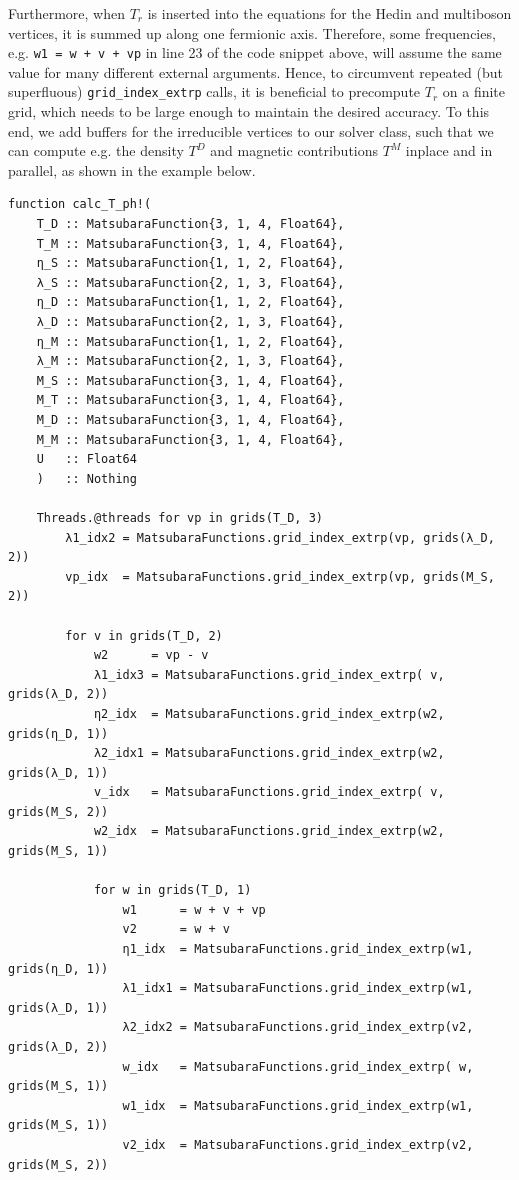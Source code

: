 \documentclass{SciPost}
\begin{document}
Furthermore, when $T_r$ is inserted into the equations for the Hedin and multiboson vertices, it is summed up along one fermionic axis. Therefore, some frequencies, e.g. \texttt{w1 = w + v + vp} in line 23 of the code snippet above, will assume the same value for many different external arguments. Hence, to circumvent repeated (but superfluous) \texttt{grid\_index\_extrp} calls, it is beneficial to precompute $T_r$ on a finite grid, which needs to be large enough to maintain the desired accuracy. To this end, we add buffers for the irreducible vertices to our solver class, such that we can compute e.g. the density $T^D$ and magnetic contributions $T^M$ inplace and in parallel, as shown in the example below.
%
\begin{verbatim}
function calc_T_ph!(
    T_D :: MatsubaraFunction{3, 1, 4, Float64},
    T_M :: MatsubaraFunction{3, 1, 4, Float64},
    η_S :: MatsubaraFunction{1, 1, 2, Float64},
    λ_S :: MatsubaraFunction{2, 1, 3, Float64},
    η_D :: MatsubaraFunction{1, 1, 2, Float64},
    λ_D :: MatsubaraFunction{2, 1, 3, Float64},
    η_M :: MatsubaraFunction{1, 1, 2, Float64},
    λ_M :: MatsubaraFunction{2, 1, 3, Float64},
    M_S :: MatsubaraFunction{3, 1, 4, Float64},
    M_T :: MatsubaraFunction{3, 1, 4, Float64},
    M_D :: MatsubaraFunction{3, 1, 4, Float64},
    M_M :: MatsubaraFunction{3, 1, 4, Float64},
    U   :: Float64
    )   :: Nothing

    Threads.@threads for vp in grids(T_D, 3)
        λ1_idx2 = MatsubaraFunctions.grid_index_extrp(vp, grids(λ_D, 2))
        vp_idx  = MatsubaraFunctions.grid_index_extrp(vp, grids(M_S, 2))

        for v in grids(T_D, 2)
            w2      = vp - v
            λ1_idx3 = MatsubaraFunctions.grid_index_extrp( v, grids(λ_D, 2))
            η2_idx  = MatsubaraFunctions.grid_index_extrp(w2, grids(η_D, 1))
            λ2_idx1 = MatsubaraFunctions.grid_index_extrp(w2, grids(λ_D, 1))
            v_idx   = MatsubaraFunctions.grid_index_extrp( v, grids(M_S, 2))
            w2_idx  = MatsubaraFunctions.grid_index_extrp(w2, grids(M_S, 1))

            for w in grids(T_D, 1)
                w1      = w + v + vp
                v2      = w + v
                η1_idx  = MatsubaraFunctions.grid_index_extrp(w1, grids(η_D, 1))
                λ1_idx1 = MatsubaraFunctions.grid_index_extrp(w1, grids(λ_D, 1))
                λ2_idx2 = MatsubaraFunctions.grid_index_extrp(v2, grids(λ_D, 2))
                w_idx   = MatsubaraFunctions.grid_index_extrp( w, grids(M_S, 1))
                w1_idx  = MatsubaraFunctions.grid_index_extrp(w1, grids(M_S, 1))
                v2_idx  = MatsubaraFunctions.grid_index_extrp(v2, grids(M_S, 2))


\end{verbatim}
\end{document}
